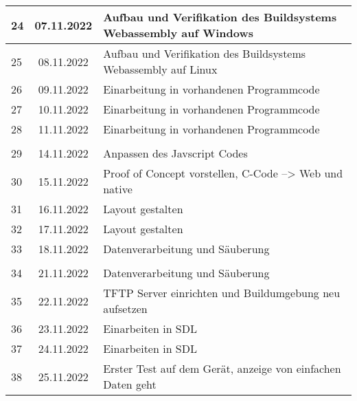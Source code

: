 \begin{longtable}{|l|c|l|}
24  & 07.11.2022    & Aufbau und Verifikation des Buildsystems Webassembly auf Windows                                                      \\ \hline   
25  & 08.11.2022    & Aufbau und Verifikation des Buildsystems Webassembly auf Linux                                                        \\ \hline   
26  & 09.11.2022    & Einarbeitung in vorhandenen Programmcode                                                      \\ \hline   
27  & 10.11.2022    &  Einarbeitung in vorhandenen Programmcode                                                       \\ \hline   
28  & 11.11.2022    &  Einarbeitung in vorhandenen Programmcode                                                    \\ \hline  
&               &                                                       \\ \hline 
29  & 14.11.2022    & Anpassen des Javscript Codes                                                      \\ \hline   
30  & 15.11.2022    & Proof of Concept vorstellen, C-Code --> Web und native  \\ \hline   
31  & 16.11.2022    & Layout gestalten                                                      \\ \hline   
32  & 17.11.2022    & Layout gestalten                                                      \\ \hline   
33  & 18.11.2022    & Datenverarbeitung und Säuberung                                                      \\ \hline
&               &                                                       \\ \hline 
34  & 21.11.2022    & Datenverarbeitung und Säuberung                                                      \\ \hline 
35  & 22.11.2022    & TFTP Server einrichten und Buildumgebung neu aufsetzen                                                      \\ \hline   
36  & 23.11.2022    & Einarbeiten in SDL                                                      \\ \hline   
37  & 24.11.2022    & Einarbeiten in SDL                                                      \\ \hline   
38  & 25.11.2022    & Erster Test auf dem Gerät, anzeige von einfachen Daten geht                                                      \\ \hline 

\end{longtable}
